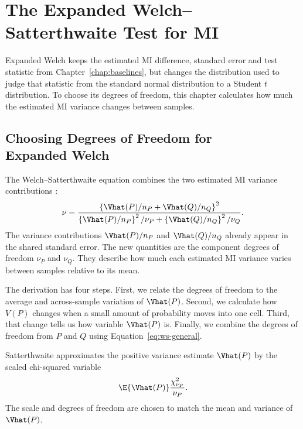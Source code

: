 \chapter{The Expanded Welch--Satterthwaite Test for MI}
\label{chap:expanded}

Expanded Welch keeps the estimated MI difference, standard error and test
statistic from Chapter~\ref{chap:baselines}, but changes the distribution used
to judge that statistic from the standard normal distribution to a Student
\(t\) distribution. To choose its degrees of freedom, this chapter calculates
how much the estimated MI variance changes between samples.

\section[Choosing Degrees of Freedom for Expanded Welch]{Choosing Degrees of
Freedom for\\Expanded Welch}

The Welch--Satterthwaite equation combines the two estimated MI variance
contributions
\citep{satterthwaite1946,welch1947}:
\begin{equation}
  \nu
  =
  \frac{
  \left\{\Vhat(P)/n_P+\Vhat(Q)/n_Q\right\}^2
  }{
  \left\{\Vhat(P)/n_P\right\}^2/\nu_P
  +\left\{\Vhat(Q)/n_Q\right\}^2/\nu_Q
  }.
  \label{eq:ws-general}
\end{equation}
The variance contributions \(\Vhat(P)/n_P\) and \(\Vhat(Q)/n_Q\) already
appear in the shared standard error. The new quantities are the component
degrees of freedom \(\nu_P\) and \(\nu_Q\). They describe how much each
estimated MI variance varies between samples relative to its mean.

The derivation has four steps. First, we relate the degrees of freedom to the
average and across-sample variation of \(\Vhat(P)\). Second, we calculate how \(V(P)\)
changes when a small amount of probability moves into one cell. Third, that
change tells us how variable \(\Vhat(P)\) is. Finally, we combine the
degrees of freedom from \(P\) and \(Q\) using Equation~\eqref{eq:ws-general}.

\medskip
{}

Satterthwaite approximates the positive variance estimate \(\Vhat(P)\) by
the scaled chi-squared variable
\begin{equation}
  \E\{\Vhat(P)\}
  \frac{\chi^2_{\nu_P}}{\nu_P}.
  \label{eq:scaled-chi-working}
\end{equation}
The scale and degrees of freedom are chosen to match the mean and variance
of \(\Vhat(P)\).

